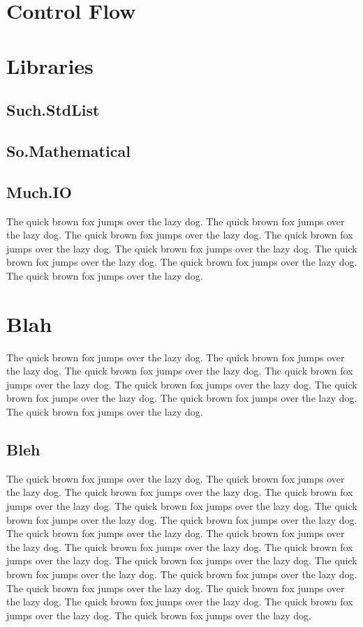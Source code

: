 \documentclass{refcard}
\begin{document}
\section{Control Flow}

\section{Libraries}

\subsection{Such.StdList}

\subsection{So.Mathematical}

\subsection{Much.IO}

The quick brown fox jumps over the lazy dog.
The quick brown fox jumps over the lazy dog.
The quick brown fox jumps over the lazy dog.
The quick brown fox jumps over the lazy dog.
The quick brown fox jumps over the lazy dog.
The quick brown fox jumps over the lazy dog.
The quick brown fox jumps over the lazy dog.
The quick brown fox jumps over the lazy dog.

\section{Blah}

The quick brown fox jumps over the lazy dog.
The quick brown fox jumps over the lazy dog.
The quick brown fox jumps over the lazy dog.
The quick brown fox jumps over the lazy dog.
The quick brown fox jumps over the lazy dog.
The quick brown fox jumps over the lazy dog.
The quick brown fox jumps over the lazy dog.
The quick brown fox jumps over the lazy dog.

\subsection{Bleh}

The quick brown fox jumps over the lazy dog.
The quick brown fox jumps over the lazy dog.
The quick brown fox jumps over the lazy dog.
The quick brown fox jumps over the lazy dog.
The quick brown fox jumps over the lazy dog.
The quick brown fox jumps over the lazy dog.
The quick brown fox jumps over the lazy dog.
The quick brown fox jumps over the lazy dog.
The quick brown fox jumps over the lazy dog.
The quick brown fox jumps over the lazy dog.
The quick brown fox jumps over the lazy dog.
The quick brown fox jumps over the lazy dog.
The quick brown fox jumps over the lazy dog.
The quick brown fox jumps over the lazy dog.
The quick brown fox jumps over the lazy dog.
The quick brown fox jumps over the lazy dog.
The quick brown fox jumps over the lazy dog.
The quick brown fox jumps over the lazy dog.
The quick brown fox jumps over the lazy dog.
\end{document}

